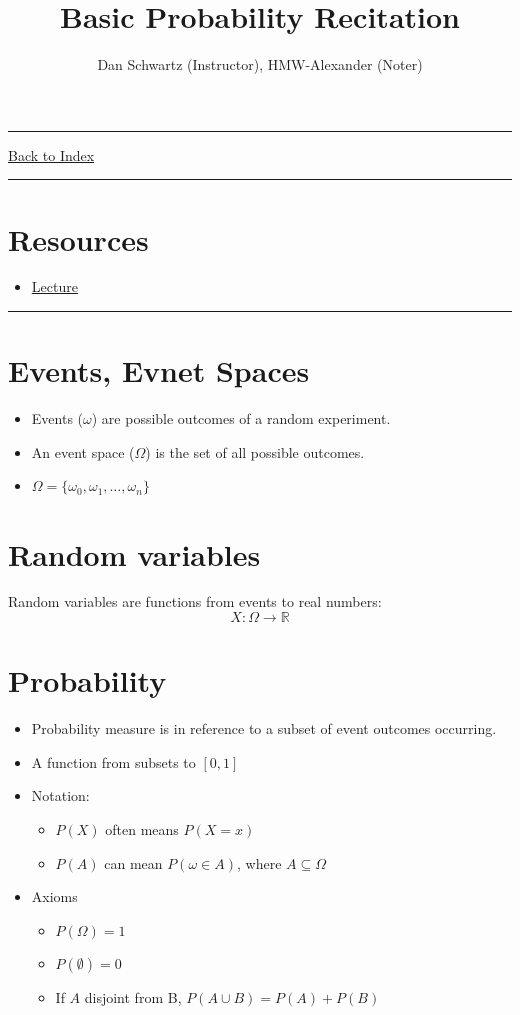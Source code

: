 \documentclass[letterpaper,10pt]{article}
\title{\textbf{Basic Probability Recitation}}
\author{Dan Schwartz (Instructor), HMW-Alexander (Noter)}
\newcommand{\panhline}{\begin{center}\rule{\textwidth}{1pt}\end{center}}
\begin{document}
\maketitle

\panhline
\href{../index.html}{Back to Index}

\panhline
\tableofcontents

\section*{Resources}

\begin{itemize}
	\item \href{../../Lectures/R1_BasicProbability.pdf}{Lecture}
\end{itemize}

\panhline

\section{Events, Evnet Spaces}

\begin{itemize}
	\item Events ($\omega$) are possible outcomes of a random experiment.
	\item An event space ($\Omega$) is the set of all possible outcomes.
	\item $\Omega=\{\omega_0, \omega_1, \dots, \omega_n\}$
\end{itemize}

\section{Random variables}

Random variables are functions from events to real numbers: $$X: \Omega \rightarrow \mathbb{R}$$

\section{Probability}

\begin{itemize}
	\item Probability measure is in reference to a subset of event outcomes occurring.
	\item A function from subsets to $[0,1]$
	\item Notation:
	\begin{itemize}
		\item $P(X)$ often means $P(X=x)$
		\item $P(A)$ can mean $P(\omega \in A)$, where $A\subseteq\Omega$
	\end{itemize}
	\item Axioms
	\begin{itemize}
		\item $P(\Omega)=1$
		\item $P(\emptyset)=0$
		\item If $A$ disjoint from B, $P(A \cup B)=P(A)+P(B)$
	\end{itemize}
\end{itemize}
\end{document}
